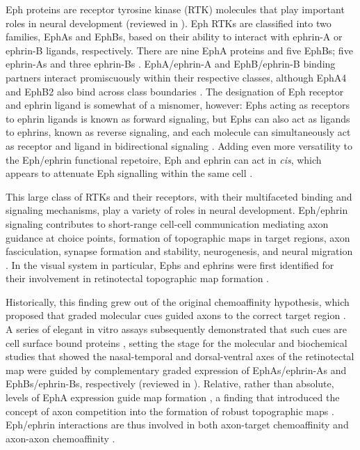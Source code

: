Eph proteins are receptor tyrosine kinase (RTK) molecules that play important roles in neural development (reviewed in ).
Eph RTKs are classified into two families, EphAs and EphBs, based on their ability to interact with ephrin-A or ephrin-B ligands, respectively.
There are nine EphA proteins and five EphBs; five ephrin-As and three ephrin-Bs \cite{lisabeth2013eph,kania2016mechanisms}.
EphA/ephrin-A and EphB/ephrin-B binding partners interact promiscuously within their respective classes, although EphA4 and EphB2 also bind across class boundaries \cite{lisabeth2013eph,kania2016mechanisms}.
The designation of Eph receptor and ephrin ligand is somewhat of a misnomer, however: Ephs acting as receptors to ephrin ligands is known as forward signaling, but Ephs can also act as ligands to ephrins, known as reverse signaling, and each molecule can simultaneously act as receptor and ligand in bidirectional signaling \cite{egea2007bidirectional,kania2016mechanisms}.
Adding even more versatility to the Eph/ephrin functional repetoire, Eph and ephrin can act in \emph{cis}, which appears to attenuate Eph signalling within the same cell \cite{marquardt2005coexpressed,carvalho2006silencing,kao2011ephrin}.

This large class of RTKs and their receptors, with their multifaceted binding and signaling mechanisms, play a variety of roles in neural development.
Eph/ephrin signaling contributes to short-range cell-cell communication mediating axon guidance at choice points, formation of topographic maps in target regions, axon fasciculation, synapse formation and stability, neurogenesis, and neural migration \cite{kania2016mechanisms}.
In the visual system in particular, Ephs and ephrins were first identified for their involvement in retinotectal topographic map formation \cite{cheng1995complementary,drescher1995vitro}.

Historically, this finding grew out of the original chemoaffinity hypothesis, which proposed that graded molecular cues guided axons to the correct target region \cite{attardi1963preferential,sperry1963chemoaffinity}.
A series of elegant in vitro assays subsequently demonstrated that such cues are cell surface bound proteins \cite{walter1987recognition,walter1987avoidance,walter1990axonal}, setting the stage for the molecular and biochemical studies that showed the nasal-temporal and dorsal-ventral axes of the retinotectal map were guided by complementary graded expression of EphAs/ephrin-As and EphBs/ephrin-Bs, respectively (reviewed in ).
Relative, rather than absolute, levels of EphA expression guide map formation \cite{brown2000topographic}, a finding that introduced the concept of axon competition into the formation of robust topographic maps \cite{feldheim2010visual,triplett2012eph}.
Eph/ephrin interactions are thus involved in both axon-target chemoaffinity and axon-axon chemoaffinity \cite{weth2014chemoaffinity}.